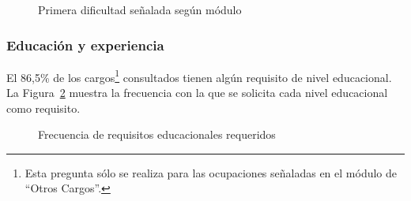 \documentclass[
  11pt,
]{article}
\begin{document}
\begin{figure}[H]

\caption{\label{fig-dificultad}Primera dificultad señalada según módulo}


\end{figure}%

\newpage

\subsubsection{Educación y
experiencia}\label{educaciuxf3n-y-experiencia}

El 86,5\% de los cargos\footnote{Esta pregunta sólo se realiza para las
  ocupaciones señaladas en el módulo de ``Otros Cargos''.} consultados
tienen algún requisito de nivel educacional. La
Figura~\ref{fig-educ-tot} muestra la frecuencia con la que se solicita
cada nivel educacional como requisito.

\begin{figure}[H]

\caption{\label{fig-educ-tot}Frecuencia de requisitos educacionales
requeridos}


\end{figure}%
\end{document}
